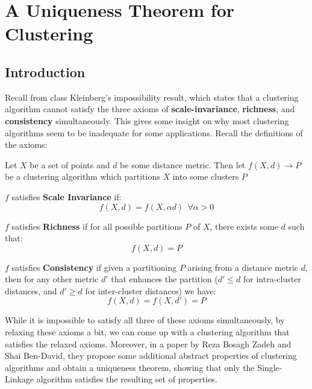 \section{A Uniqueness Theorem for Clustering}

\subsection*{Introduction}

Recall from class Kleinberg's impossibility result, which states that a clustering algorithm cannot satisfy the three axioms of \textbf{scale-invariance}, \textbf{richness}, and \textbf{consistency} simultaneously. This gives some insight on why most clustering algorithms seem to be inadequate for some applications. Recall the definitions of the axioms:

Let $X$ be a set of points and $d$ be some distance metric. Then let $f(X,d) \rightarrow P$ be a clustering algorithm which partitions $X$ into some clusters $P$

\begin{definition}
    $f$ satisfies \textbf{Scale Invariance} if:
    $$
    f(X, d) = f(X, \alpha d) \ \  \forall \alpha > 0
    $$
\end{definition}

\begin{definition}
    $f$ satisfies \textbf{Richness} if for all possible partitions $P$ of $X$, there exists some $d$ such that:
    $$
    f(X, d) = P
    $$
\end{definition}

\begin{definition}
    $f$ satisfies \textbf{Consistency} if given a partitioning $P$ arising from a distance metric $d$, then for any other metric $d'$ that enhances the partition ($d' \leq d$ for intra-cluster distances, and $d' \geq d$ for inter-cluster distances) we have:
    $$
    f(X,d) = f(X,d') = P
    $$
\end{definition}

While it is impossible to satisfy all three of these axioms simultaneously, by relaxing these axioms a bit, we can come up with a clustering algorithm that satisfies the relaxed axioms. Moreover, in a paper by Reza Bosagh Zadeh and Shai Ben-David, they propose some additional abstract properties of clustering algorithms and obtain a uniqueness theorem, showing that only the Single-Linkage algorithm satisfies the resulting set of properties.


\newpage


